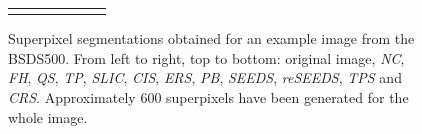 \documentclass[runningheads]{llncs}
\begin{document}
\begin{figure}[t]
\begin{tabularx}{\linewidth}{@{}Y@{}Y@{}Y@{}Y@{}Y@{}Y@{}Y@{}}
{            }
            &
            &
            &
        \end{tabularx}
        \vspace{-2.5mm}
        \caption{Superpixel segmentations obtained for an example image from the BSDS500. From left to right, top to bottom: original image, \textit{NC}, \textit{FH}, \textit{QS}, \textit{TP}, \textit{SLIC}, \textit{CIS}, \textit{ERS}, \textit{PB}, \textit{SEEDS}, \textit{reSEEDS}, \textit{TPS} and \textit{CRS}. Approximately $600$ superpixels have been generated for the whole image.}
        \label{fig:qualitative-bsd}
    \end{figure}
    
\end{document}
